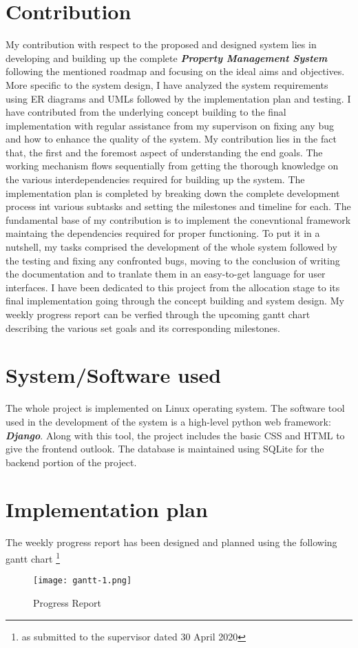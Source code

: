 \documentclass[12pt]{report}
\begin{document}
\section{Contribution}
My contribution with respect to the proposed and designed system lies in developing and building up the complete \textbf{\textit{Property Management System}} following the mentioned roadmap and focusing on the ideal aims and objectives. More specific to the system design, I have analyzed the system requirements using ER diagrams and UMLs followed by the implementation plan and testing. I have contributed from the underlying concept building to the final implementation with regular assistance from my supervison on fixing any bug and how to enhance the quality of the system. My contribution lies in the fact that, the first and the foremost aspect of understanding the end goals. The working mechanism flows sequentially from getting the thorough knowledge on the various interdependencies required for building up the system. The implementation plan is completed by breaking down the complete development process int various subtasks and setting the milestones and timeline for each. \newline 
The fundamental base of my contribution is to implement the conevntional framework maintaing the dependencies required for proper functioning. To put it in a nutshell, my tasks comprised the development of the whole system followed by the testing and fixing any confronted bugs, moving to the conclusion of writing the documentation and to tranlate them in an easy-to-get language for user interfaces. I have been dedicated to this project from the allocation stage to its final implementation going through the concept building and system design. My weekly progress report can be verfied through the upcoming gantt chart describing the various set goals and its corresponding milestones.     

\section{System/Software used}
The whole project is implemented on Linux operating system. The software tool used in the development of the system is a high-level python web framework: \textbf{\textit{Django}}. Along with this tool, the project includes the basic CSS and HTML to give the frontend outlook. The database is maintained using SQLite for the backend portion of the project.

\newpage
\section{Implementation plan}
The weekly progress report has been designed and planned using the following gantt chart \footnote{as submitted to the supervisor dated 30 April 2020}
\begin{figure}[!htb]
\texttt{[image: gantt-1.png]}
\centering
\caption{Progress Report}
\end{figure}
\end{document}
